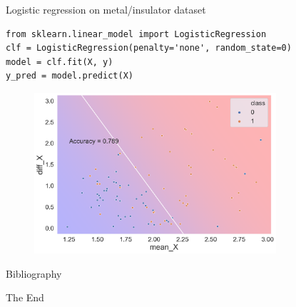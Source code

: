 \documentclass[aspectratio=169]{beamer}
\begin{document}
\begin{frame}[fragile]{Logistic regression on metal/insulator dataset}
\begin{verbatim}
from sklearn.linear_model import LogisticRegression
clf = LogisticRegression(penalty='none', random_state=0)
model = clf.fit(X, y)
y_pred = model.predict(X)
\end{verbatim}
\begin{figure}
    \centering
    \includegraphics[width=0.8\textwidth]{figures/logistic_metal_insulator.png}
\end{figure}
\end{frame} 


\begin{frame}{Bibliography}
    
    
\end{frame}


\begin{frame}
    \Huge{\centerline{The End}}
\end{frame}
\end{document}
